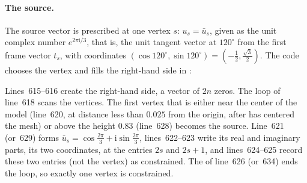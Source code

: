 \paragraph{The source.} The source vector is prescribed at one vertex $s$: $u_s = \bar u_s$, given as the unit complex number $e^{2 \pi \mathrm i / 3}$, that is, the unit tangent vector at $120^\circ$ from the first frame vector $t_s$, with coordinates $(\cos 120^\circ, \sin 120^\circ) = (-\frac12, \frac{\sqrt3}{2})$. The code chooses the vertex and fills the right-hand side in :

Lines~615--616 create the right-hand side, a vector of $2n$ zeros. The loop of line~618 scans the vertices. The first vertex that is either near the center of the model (line~620, at distance less than $0.025$ from the origin, after  has centered the mesh) or above the height $0.83$ (line~628) becomes the source. Line~621 (or~629) forms $\bar u_s = \cos\frac{2\pi}{3} + \mathrm i\sin\frac{2\pi}{3}$, lines~622--623 write its real and imaginary parts, its two coordinates, at the entries $2s$ and $2s + 1$, and lines~624--625 record these two entries (not the vertex) as constrained. The  of line~626 (or~634) ends the loop, so exactly one vertex is constrained.

